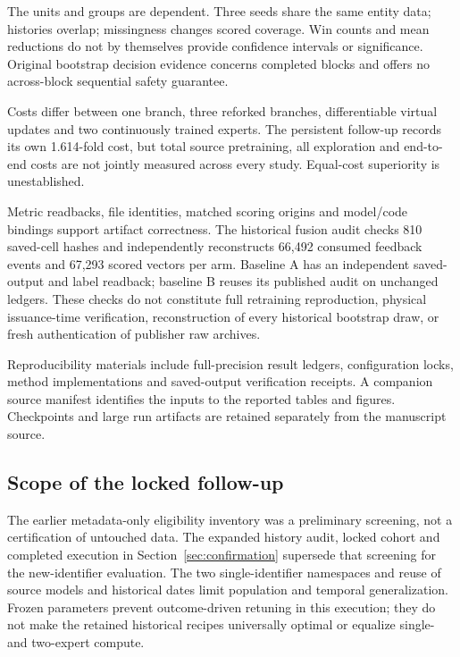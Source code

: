 \documentclass[pdflatex,iicol,sn-mathphys-num]{sn-jnl}
\begin{document}
The units and groups are dependent. Three seeds share the same entity data; histories overlap; missingness changes scored coverage. Win counts and mean reductions do not by themselves provide confidence intervals or significance. Original bootstrap decision evidence concerns completed blocks and offers no across-block sequential safety guarantee.

Costs differ between one branch, three reforked branches, differentiable virtual updates and two continuously trained experts. The persistent follow-up records its own 1.614-fold cost, but total source pretraining, all exploration and end-to-end costs are not jointly measured across every study. Equal-cost superiority is unestablished.

Metric readbacks, file identities, matched scoring origins and model/code bindings support artifact correctness. The historical fusion audit checks 810 saved-cell hashes and independently reconstructs 66,492 consumed feedback events and 67,293 scored vectors per arm. Baseline A has an independent saved-output and label readback; baseline B reuses its published audit on unchanged ledgers. These checks do not constitute full retraining reproduction, physical issuance-time verification, reconstruction of every historical bootstrap draw, or fresh authentication of publisher raw archives.

Reproducibility materials include full-precision result ledgers, configuration locks, method implementations and saved-output verification receipts. A companion source manifest identifies the inputs to the reported tables and figures. Checkpoints and large run artifacts are retained separately from the manuscript source.

\subsection{Scope of the locked follow-up}
The earlier metadata-only eligibility inventory was a preliminary screening, not a certification of untouched data. The expanded history audit, locked cohort and completed execution in Section~\ref{sec:confirmation} supersede that screening for the new-identifier evaluation. The two single-identifier namespaces and reuse of source models and historical dates limit population and temporal generalization. Frozen parameters prevent outcome-driven retuning in this execution; they do not make the retained historical recipes universally optimal or equalize single- and two-expert compute.
\end{document}
